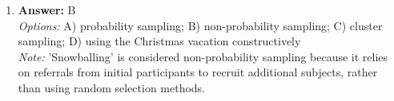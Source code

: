\documentclass[12pt]{article}
\begin{document}
\begin{enumerate}[label=\arabic*.]
\\ \textit{Note:} Fulcher \& Scott argue that community can be defined by social relationships and shared values rather than solely by a fixed geographical location, which is why this option is identified as not a criterion of community.
\item \textbf{Answer:} B
\\ \textit{Options:} A) probability sampling; B) non-probability sampling; C) cluster sampling; D) using the Christmas vacation constructively
\\ \textit{Note:} 'Snowballing' is considered non-probability sampling because it relies on referrals from initial participants to recruit additional subjects, rather than using random selection methods.
\end{enumerate}
\end{document}
